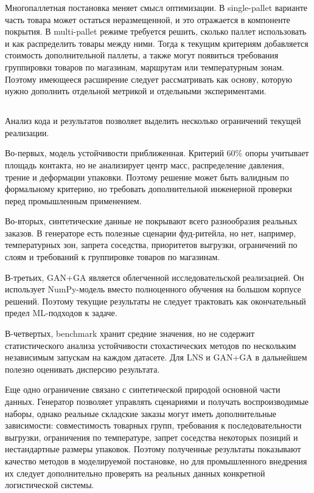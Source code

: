 Многопаллетная постановка меняет смысл оптимизации. В single-pallet варианте часть товара может остаться неразмещенной, и это отражается в компоненте покрытия. В multi-pallet режиме требуется решить, сколько паллет использовать и как распределить товары между ними. Тогда к текущим критериям добавляется стоимость дополнительной паллеты, а также могут появиться требования группировки товаров по магазинам, маршрутам или температурным зонам. Поэтому имеющееся расширение следует рассматривать как основу, которую нужно дополнить отдельной метрикой и отдельными экспериментами.

\subsection{}

Анализ кода и результатов позволяет выделить несколько ограничений текущей реализации.

Во-первых, модель устойчивости приближенная. Критерий 60\% опоры учитывает площадь контакта, но не анализирует центр масс, распределение давления, трение и деформации упаковки. Поэтому решение может быть валидным по формальному критерию, но требовать дополнительной инженерной проверки перед промышленным применением.

Во-вторых, синтетические данные не покрывают всего разнообразия реальных заказов. В генераторе есть полезные сценарии фуд-ритейла, но нет, например, температурных зон, запрета соседства, приоритетов выгрузки, ограничений по слоям и требований к группировке товаров по магазинам.

В-третьих, GAN+GA является облегченной исследовательской реализацией. Он использует NumPy-модель вместо полноценного обучения на большом корпусе решений. Поэтому текущие результаты не следует трактовать как окончательный предел ML-подходов к задаче.

В-четвертых, benchmark хранит средние значения, но не содержит статистического анализа устойчивости стохастических методов по нескольким независимым запускам на каждом датасете. Для LNS и GAN+GA в дальнейшем полезно оценивать дисперсию результата.

Еще одно ограничение связано с синтетической природой основной части данных. Генератор позволяет управлять сценариями и получать воспроизводимые наборы, однако реальные складские заказы могут иметь дополнительные зависимости: совместимость товарных групп, требования к последовательности выгрузки, ограничения по температуре, запрет соседства некоторых позиций и нестандартные размеры упаковок. Поэтому полученные результаты показывают качество методов в моделируемой постановке, но для промышленного внедрения их следует дополнительно проверять на реальных данных конкретной логистической системы.

